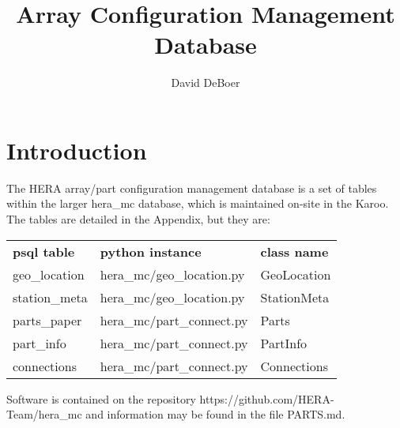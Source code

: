 \documentclass{article}
\begin{document}
\author{David DeBoer}
\title{Array Configuration Management Database}
\maketitle

\section{Introduction}
The HERA array/part configuration management database is a set of tables within the larger hera\_mc database, which is maintained on-site in the Karoo.  The tables are detailed in the Appendix, but they are:  
\begin{tabular}{l l l}
         {\bf psql table} & {\bf python instance}  &  {\bf class name} \\
	geo\_location 	& hera\_mc/geo\_location.py & GeoLocation \\
	station\_meta 	& hera\_mc/geo\_location.py & StationMeta \\
	parts\_paper 	& hera\_mc/part\_connect.py & Parts \\
	part\_info 	         & hera\_mc/part\_connect.py & PartInfo \\
	connections 	& hera\_mc/part\_connect.py & Connections \\
\end{tabular}

Software is contained on the repository https://github.com/HERA-Team/hera\_mc and information may be found in the file PARTS.md.

\end{document}
